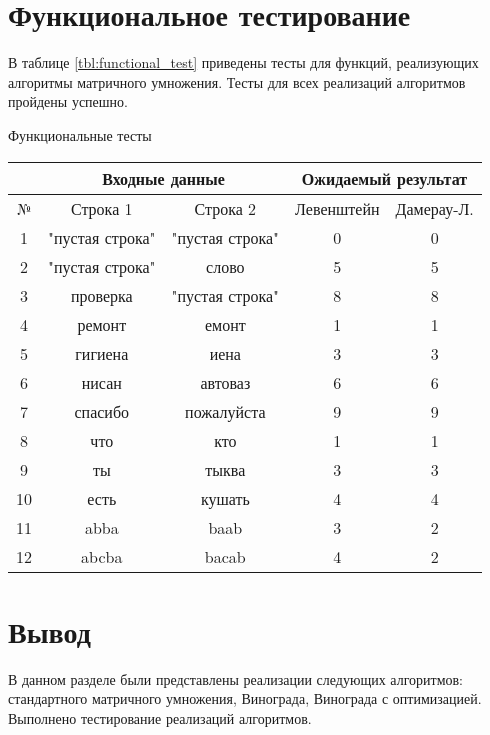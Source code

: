 \section{Функциональное тестирование}

В таблице \ref{tbl:functional_test} приведены тесты для функций, реализующих алгоритмы матричного умножения. Тесты для всех реализаций алгоритмов пройдены успешно.
	\begin{center}

				\begin{threeparttable}
					\captionsetup{justification=raggedright,singlelinecheck=off}
					\caption{\label{tbl:functional_test} Функциональные тесты}
					\begin{tabular}{|c|c|c|c|c|}
						\hline
						& \multicolumn{2}{c|}{Входные данные}  & \multicolumn{2}{c|}{Ожидаемый результат} \\
						\hline
						№&Строка 1&Строка 2&Левенштейн&Дамерау-Л. \\
						\hline
						1&"пустая строка"&"пустая строка"&0&0 \\
						\hline
						2&"пустая строка"&слово&5&5 \\
						\hline
						3&проверка&"пустая строка"&8&8 \\
						\hline
						4&ремонт&емонт&1&1 \\
						\hline
						5&гигиена&иена&3&3 \\
						\hline
						6&нисан&автоваз&6&6 \\
						\hline
						7&спасибо&пожалуйста&9&9 \\
						\hline
						8&что&кто&1&1 \\
						\hline
						9&ты&тыква&3&3 \\
						\hline
						10&есть&кушать&4&4 \\
						\hline
						11&abba&baab&3&2 \\
						\hline
						12&abcba&bacab&4&2 \\
						\hline
					\end{tabular}
				\end{threeparttable}


	\end{center}



\section*{Вывод}
В данном разделе были представлены реализации следующих алгоритмов: стандартного матричного умножения, Винограда, Винограда с оптимизацией. Выполнено тестирование реализаций алгоритмов.